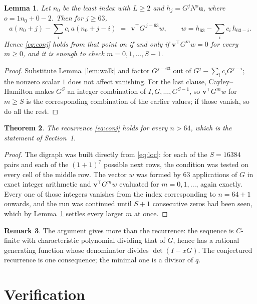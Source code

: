 \documentclass[11pt,a4paper]{article}
\theoremstyle{plain}
\newtheorem{theorem}{Theorem}
\newtheorem{lemma}[theorem]{Lemma}
\theoremstyle{definition}
\newtheorem{remark}[theorem]{Remark}
\begin{document}
\begin{lemma}\label{lem:crit}
Let $n_0$ be the least index with $L\ge2$ and $h_j=G^{j}N^{o}\mathbf{u}$, where
$o=1n_0+0-2$. Then for $j\ge63$,
\[
a(n_0+j)-\sum_i c_i\,a(n_0+j-i)\;=\;\,\mathbf{v}^{\!\top}G^{\,j-63}w,
\qquad w=h_{63}-\sum_i c_i\,h_{63-i} .
\]
Hence \eqref{eq:conj} holds from that point on if and only if
$\mathbf{v}^{\!\top}G^{m}w=0$ for every $m\ge0$, and it is enough to check
$m=0,1,\dots,S-1$.
\end{lemma}

\begin{proof}
Substitute Lemma~\ref{lem:walk} and factor $G^{j-63}$ out of
$G^{j}-\sum_ic_iG^{j-i}$; the nonzero scalar $1$ does not affect
vanishing. For the last clause, Cayley--Hamilton makes $G^{S}$ an integer combination of
$I,G,\dots,G^{S-1}$, so $\mathbf{v}^{\!\top}G^{m}w$ for $m\ge S$ is the corresponding
combination of the earlier values; if those vanish, so do all the rest.
\end{proof}

\begin{theorem}
The recurrence \eqref{eq:conj} holds for every $n>64$, which is the statement of
Section~1.
\end{theorem}

\begin{proof}
The digraph was built directly from \eqref{eq:loc}: for each of the $S=16384$ pairs and each
of the $(1+1)^{7}$ possible next rows, the condition was tested on every cell of
the middle row. The vector $w$ was formed by $63$ applications of $G$ in exact integer
arithmetic and $\mathbf{v}^{\!\top}G^{m}w$ evaluated for $m=0,1,\dots$, again exactly.
Every one of those integers vanishes from the index corresponding to $n=64+1$ onwards,
and the run was continued until $S+1$ consecutive zeros had been seen, which by
Lemma~\ref{lem:crit} settles every larger $m$ at once.
\end{proof}

\begin{remark}
The argument gives more than the recurrence: the sequence is $C$-finite with characteristic
polynomial dividing that of $G$, hence has a rational generating function whose denominator
divides $\det(I-xG)$. The conjectured recurrence is one consequence; the minimal one is a
divisor of $q$.
\end{remark}

\section{Verification}
\end{document}
